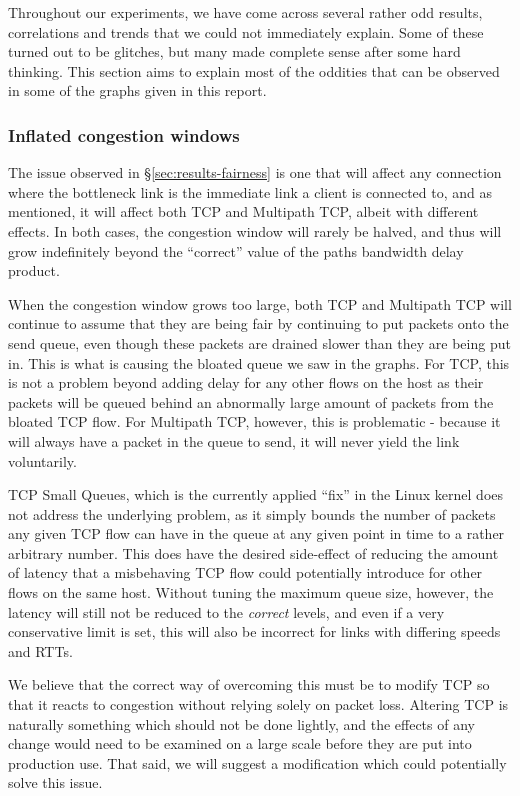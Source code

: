 Throughout our experiments, we have come across several rather odd results,
correlations and trends that we could not immediately explain. Some of these
turned out to be glitches, but many made complete sense after some hard
thinking. This section aims to explain most of the oddities that can be observed
in some of the graphs given in this report.

\subsubsection{Inflated congestion windows}
\label{sec:closing:inflated:cwnd}
The issue observed in \S\ref{sec:results-fairness} is one that will affect any
connection where the bottleneck link is the immediate link a client is connected
to, and as mentioned, it will affect both TCP and Multipath TCP, albeit with
different effects. In both cases, the congestion window will rarely be halved,
and thus will grow indefinitely beyond the ``correct'' value of the paths
bandwidth delay product.

When the congestion window grows too large, both TCP and Multipath TCP will
continue to assume that they are being fair by continuing to put packets onto
the send queue, even though these packets are drained slower than they are being
put in. This is what is causing the bloated queue we saw in the graphs. For TCP,
this is not a problem beyond adding delay for any other flows on the host as
their packets will be queued behind an abnormally large amount of packets from
the bloated TCP flow. For Multipath TCP, however, this is problematic - because
it will always have a packet in the queue to send, it will never yield the link
voluntarily.

TCP Small Queues, which is the currently applied ``fix'' in the Linux kernel
does not address the underlying problem, as it simply bounds the number of
packets any given TCP flow can have in the queue at any given point in time to a
rather arbitrary number. This does have the desired side-effect of reducing the
amount of latency that a misbehaving TCP flow could potentially introduce for
other flows on the same host. Without tuning the maximum queue size, however,
the latency will
still not be reduced to the \emph{correct} levels, and even if a very conservative
limit is set, this will also be incorrect for links with differing
speeds and RTTs.

We believe that the correct way of overcoming this must be to modify TCP so that it
reacts to congestion without relying solely on packet loss. Altering TCP is naturally
something which should not
be done lightly, and the effects of any change would need to be examined
on a large scale before they are put into production use. That said, we will suggest
a modification which could potentially solve this issue.

